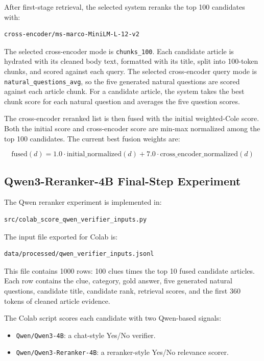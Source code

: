 \documentclass[11pt]{article}
\begin{document}
After first-stage retrieval, the selected system reranks the top 100 candidates with:

\begin{verbatim}
cross-encoder/ms-marco-MiniLM-L-12-v2
\end{verbatim}

The selected cross-encoder mode is \texttt{chunks\_100}. Each candidate article is hydrated with its cleaned body text, formatted with its title, split into 100-token chunks, and scored against each query. The selected cross-encoder query mode is \texttt{natural\_questions\_avg}, so the five generated natural questions are scored against each article chunk. For a candidate article, the system takes the best chunk score for each natural question and averages the five question scores.

The cross-encoder reranked list is then fused with the initial weighted-Cole score. Both the initial score and cross-encoder score are min-max normalized among the top 100 candidates. The current best fusion weights are:

\[
\text{fused}(d) = 1.0 \cdot \text{initial\_normalized}(d)
+ 7.0 \cdot \text{cross\_encoder\_normalized}(d)
\]

\subsection{Qwen3-Reranker-4B Final-Step Experiment}

The Qwen reranker experiment is implemented in:

\begin{verbatim}
src/colab_score_qwen_verifier_inputs.py
\end{verbatim}

The input file exported for Colab is:

\begin{verbatim}
data/processed/qwen_verifier_inputs.jsonl
\end{verbatim}

This file contains 1000 rows: 100 clues times the top 10 fused candidate articles. Each row contains the clue, category, gold answer, five generated natural questions, candidate title, candidate rank, retrieval scores, and the first 360 tokens of cleaned article evidence.

The Colab script scores each candidate with two Qwen-based signals:

\begin{itemize}[leftmargin=*]
  \item \texttt{Qwen/Qwen3-4B}: a chat-style Yes/No verifier.
  \item \texttt{Qwen/Qwen3-Reranker-4B}: a reranker-style Yes/No relevance scorer.
\end{itemize}
\end{document}
